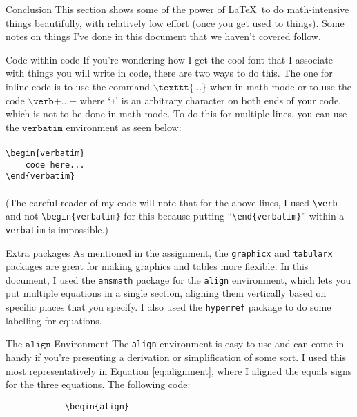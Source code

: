 \documentclass[onecolumn]{article}
\begin{document}
\begin{section}{Conclusion}
	This section shows some of the power of \LaTeX~to do math-intensive things beautifully, with relatively low effort (once you get used to things). Some notes on things I've done in
	this document that we haven't covered follow.
	\begin{subsection}{Code within code}
		If you're wondering how I get the cool font that I associate with things you will write in code, there are two ways to do this. The one for inline code is to use the command
		$\backslash{\texttt{texttt\{...\}}}$ when in math mode or to use the code $\backslash{\texttt{verb+...+}}$ where `\verb_+_' is an arbitrary character on both ends
		of your code, which is not to be done in math mode. To do this for multiple lines, you can use the $\texttt{verbatim}$ environment as seen below:\\ \\
		\verb+\begin{verbatim}+ \\
		\verb+    code here...+ \\
		\verb+\end{verbatim}+
		\\ \\
		(The careful reader of my code will note that for the above lines, I used \verb+\verb+ and not \verb+\begin{verbatim}+ for this because putting ``\verb+\end{verbatim}+''
		within a \verb+verbatim+ is impossible.)
	\end{subsection}
	\begin{subsection}{Extra packages}
		As mentioned in the assignment, the \verb+graphicx+ and \verb+tabularx+ packages are great for making graphics and tables more flexible. In this document, I used
		the \verb+amsmath+ package for the \verb+align+ environment, which lets you put multiple equations in a single section, aligning them vertically based on specific
		places that you specify. I also used the \verb+hyperref+ package to do some labelling for equations.
		\begin{subsubsection}{The $\texttt{align}$ Environment}
			The \verb+align+ environment is easy to use and can come in handy if you're presenting a derivation or simplification of some sort. I used this most representatively
			in Equation \ref{eq:alignment}, where I aligned the equals signs for the three equations. The following code:
			\begin{verbatim}
			\begin{align}

\end{verbatim}
\end{subsubsection}
\end{subsection}
\end{section}
\end{document}
